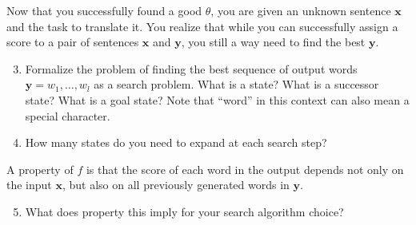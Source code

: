 \documentclass[a4paper]{article}
\newif\ifsol
\begin{document}
\begin{enumerate}
\begin{enumerate}
\end{enumerate}

Now that you successfully found a good $\theta$, you are given an unknown sentence $\textbf{x}$ and the task to translate it. You realize that while you can successfully assign a score to a pair of sentences $\textbf{x}$ and $\textbf{y}$, you still a way need to find the best $\textbf{y}$. 

\begin{enumerate}
\setcounter{enumii}{2}
\item Formalize the problem of finding the best sequence of output words $\textbf{y} = w_1, \ldots, w_l$ as a search problem. What is a state? What is a successor state? What is a goal state? Note that ``word'' in this context can also mean a special character.

\ifsol
    \textcolor{blue}{One possible way of formalizing this problem is to define a state as a sequence of input words $w_1, \ldots, w_n$, and a sequence of output words $W_1, \ldots, W_k$. The function $f$ is used to assign a score to this state. A successor state is a word $W_{k+1}$ that is appended to the output. Goal states are all sequences that end in a word that ends the sentence, such as ``.'', ``,'', ``?'', and ``!''.}
\else
    \vspace{5em}
\fi

\item How many states do you need to expand at each search step?

\ifsol
    \textcolor{blue}{We need to expand all possible words that our function knows about, also called vocabulary $\mathcal{V}$, at each step. The search space grows exponentially with length $l$ of the sequence  $|\mathcal{V}|^l$.}
\else
    \vspace{5em}
\fi

\end{enumerate}

A property of $f$ is that the score of each word in the output depends not only on the input $\textbf{x}$, but also on all previously generated words in $\textbf{y}$.

\begin{enumerate}
\setcounter{enumii}{4}
\item What does property this imply for your search algorithm choice?

\ifsol
    \textcolor{blue}{If generating a certain word would solely depend on an input, we could use a greedy hill-climbing algorithm to find the best output. However, since this is not the case, our search space likely contains many local maxima and we need to use different methods.}
\else
    \vspace{5em}
\fi


\end{enumerate}
\end{enumerate}
\end{document}
